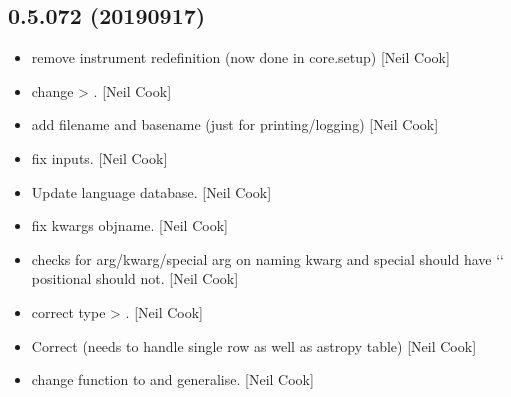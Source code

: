 \documentclass[a4paper,10pt,english]{report}
\begin{document}
\subsection{0.5.072 (2019\sphinxhyphen{}09\sphinxhyphen{}17)}
\label{\detokenize{misc/changelog:id89}}\begin{itemize}
\item {} 
 \sphinxhyphen{} remove instrument re\sphinxhyphen{}definition (now done in
core.setup) {[}Neil Cook{]}

\item {} 
 \sphinxhyphen{} change  \textendash{}\textgreater{} . {[}Neil
Cook{]}

\item {} 
 \sphinxhyphen{} add filename and basename (just for
printing/logging) {[}Neil Cook{]}

\item {} 
 \sphinxhyphen{} fix inputs. {[}Neil Cook{]}

\item {} 
Update language database. {[}Neil Cook{]}

\item {} 
 \sphinxhyphen{} fix kwargs \textendash{}objname.
{[}Neil Cook{]}

\item {} 
 \sphinxhyphen{} checks for arg/kwarg/special arg on naming
\sphinxhyphen{} kwarg and special should have ‘\sphinxhyphen{}‘ positional should not. {[}Neil Cook{]}

\item {} 
 \sphinxhyphen{} correct type  \textendash{}\textgreater{}
. {[}Neil Cook{]}

\item {} 
Correct  (needs to handle single row as well as astropy
table) {[}Neil Cook{]}

\item {} 
 \sphinxhyphen{} change function  to
 and generalise. {[}Neil Cook{]}


\end{itemize}
\end{document}
